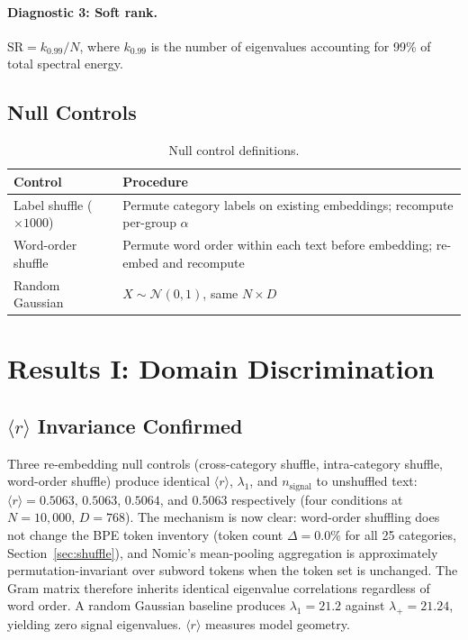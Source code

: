 \documentclass[12pt,letterpaper]{article}
\newcommand{\rbar}{\langle r \rangle}
\newcommand{\al}{\alpha}
\newcommand{\lmax}{\lambda_1}
\newcommand{\nsig}{n_{\text{signal}}}
\newcommand{\mpedge}{\lambda_+}
\begin{document}
\paragraph{Diagnostic 3: Soft rank.}
$\text{SR} = k_{0.99} / N$, where $k_{0.99}$ is the number of
eigenvalues accounting for 99\% of total spectral energy.


\subsection{Null Controls}

\begin{table}[H]
\centering
\caption{Null control definitions.}
\label{tab:controls}
\begin{tabular}{lp{9cm}}
\toprule
\textbf{Control} & \textbf{Procedure} \\
\midrule
Label shuffle ($\times 1000$) & Permute category labels on existing
embeddings; recompute per-group $\al$ \\
Word-order shuffle & Permute word order within each text before
embedding; re-embed and recompute \\
Random Gaussian & $X \sim \mathcal{N}(0,1)$, same $N \times D$ \\
\bottomrule
\end{tabular}
\end{table}


\section{Results I: Domain Discrimination}
\label{sec:discrimination}

\subsection{$\rbar$ Invariance Confirmed}
\label{sec:rbar_invariance}

Three re-embedding null controls (cross-category shuffle,
intra-category shuffle, word-order shuffle) produce identical
$\rbar$, $\lmax$, and $\nsig$ to unshuffled text: $\rbar = 0.5063$,
$0.5063$, $0.5064$, and $0.5063$ respectively (four conditions at
$N = 10{,}000$, $D = 768$).  The mechanism is now clear: word-order
shuffling does not change the BPE token inventory (token count
$\Delta = 0.0\%$ for all 25 categories, Section~\ref{sec:shuffle}),
and Nomic's mean-pooling aggregation is approximately
permutation-invariant over subword tokens when the token set is
unchanged.  The Gram matrix therefore inherits identical eigenvalue
correlations regardless of word order.  A random Gaussian baseline
produces $\lambda_1 = 21.2$ against $\mpedge = 21.24$, yielding
zero signal eigenvalues.  $\rbar$ measures model geometry.
\end{document}
